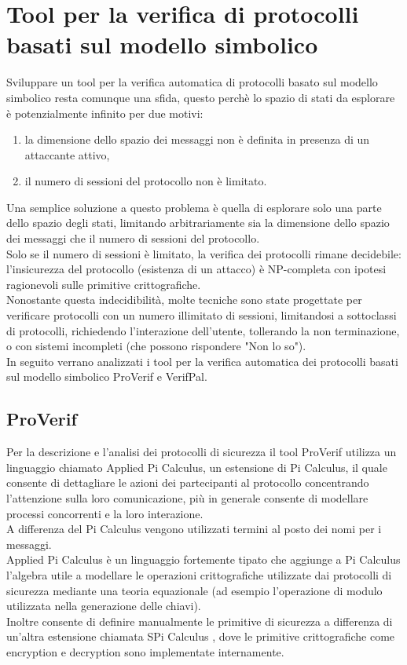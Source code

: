 \section{Tool per la verifica di protocolli basati sul modello simbolico}

Sviluppare un tool per la verifica automatica di protocolli basato sul modello simbolico resta comunque una sfida, questo perchè lo spazio di stati da esplorare è potenzialmente infinito per due motivi:
\begin{enumerate}
    \item la dimensione dello spazio dei messaggi non è definita in presenza di un attaccante attivo,
    \item il numero di sessioni del protocollo non è limitato.
\end{enumerate}
Una semplice soluzione a questo problema è quella di esplorare solo una parte dello spazio degli stati, limitando arbitrariamente sia la dimensione dello spazio dei messaggi che il numero di sessioni del protocollo.\\
Solo se il numero di sessioni è limitato, la verifica dei protocolli rimane decidebile: l'insicurezza del protocollo (esistenza di un attacco) è NP-completa con ipotesi ragionevoli sulle primitive crittografiche.\\
Nonostante questa indecidibilità, molte tecniche sono state progettate per verificare protocolli con un numero illimitato di sessioni, limitandosi a sottoclassi di protocolli, richiedendo l'interazione dell'utente, tollerando la non terminazione, o con sistemi incompleti (che possono rispondere "Non lo so").\\
In seguito verrano analizzati i tool per la verifica automatica dei protocolli basati sul modello simbolico ProVerif e VerifPal.\\


\subsection{ProVerif}\label{sub:pro}
Per la descrizione e l'analisi dei protocolli di sicurezza il tool ProVerif utilizza un linguaggio chiamato Applied Pi Calculus, un estensione di Pi Calculus, il quale consente di dettagliare le azioni dei partecipanti al protocollo concentrando l'attenzione sulla loro comunicazione, più in generale consente di modellare processi concorrenti e la loro interazione.\\
A differenza del Pi Calculus vengono utilizzati termini al posto dei nomi per i messaggi.\\
Applied Pi Calculus \cite{AF16} è un linguaggio fortemente tipato che aggiunge a  Pi Calculus l'algebra utile a modellare le operazioni crittografiche utilizzate dai protocolli di sicurezza mediante una teoria equazionale (ad esempio l'operazione di modulo utilizzata nella generazione delle chiavi).\\
Inoltre consente di definire manualmente le primitive di sicurezza a differenza di un'altra estensione chiamata SPi Calculus \cite{AG97}, dove le primitive crittografiche come encryption e decryption sono implementate internamente.\\


